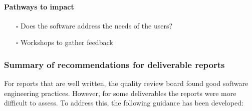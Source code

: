 \paragraph{Pathways to impact}
\label{sec:orgc218a3a}
\begin{itemize}
\item[{$\square$}] Does the software address the needs of the users?
\item[{$\square$}] Workshops to gather feedback
\end{itemize}

\subsubsection{Summary of recommendations for deliverable reports}
\label{sec:summ-recomm-deliv}
For reports that are well written, the quality review board found good
software engineering practices. However, for some deliverables the
reports were more difficult to assess. To address this, the following
guidance has been developed:

